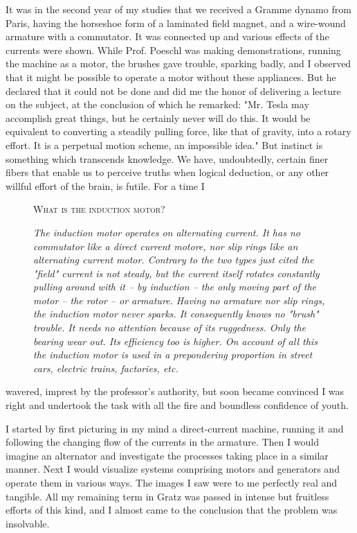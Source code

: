 \documentclass[a4paper,12pt,english,twoside,openright]{memoir}
\begin{document}
It was in the second year of my studies that we received a Gramme dynamo from Paris, having 
the horseshoe form of a laminated field magnet, and a wire-wound armature with a commutator.  
It was connected up and various effects of the currents were shown.  While Prof. Poeschl was 
making demonstrations, running the machine as a motor, the brushes gave trouble, sparking 
badly, and I observed that it might be possible to operate a motor without these appliances.  But 
he declared that it could not be done and did me the honor of delivering a lecture on the subject, 
at the conclusion of which he remarked: "Mr. Tesla may accomplish great things, but he certainly 
never will do this.  It would be equivalent to converting a steadily pulling force, like that of gravity, 
into a rotary effort.  It is a perpetual motion scheme, an impossible idea." But instinct 
is something which transcends knowledge. We have, undoubtedly, certain finer fibers that enable us to 
perceive truths when logical deduction, or any other willful effort of the brain, is futile.  For a time I 
\begin{figure}
	\begin{minipage}[t]{.63\textwidth}
		{\centering\textsc{What is the induction motor?}\par}
		\vspace{1em}
		\itshape
		The induction motor operates on alternating current. It has no commutator like a direct current motore, nor slip rings like an alternating current motor. Contrary to the two types just cited the "field" current is not steady, but the current itself rotates constantly pulling around with it -- by induction -- the only moving part of the motor -- the rotor -- or armature. Having no armature nor slip rings, the induction motor never sparks. It consequently knows no "brush" trouble. It needs no attention because of its ruggedness. Only the bearing wear out. Its efficiency too is higher. On account of all this the induction motor is used in a prepondering proportion in street cars, electric trains, factories, etc.
	\end{minipage}
	\vspace{1em}
\end{figure}
wavered, imprest by the professor's authority, but soon became convinced I was right and 
undertook the task with all the fire and boundless confidence of youth.  

I started by first picturing in my mind a direct-current machine, running it and following the 
changing flow of the currents in the armature.  Then I would imagine an alternator and investigate 
the processes taking place in a similar manner.  Next I would visualize systems comprising 
motors and generators and operate them in various ways.  The images I saw were to me 
perfectly real and tangible.  All my remaining term in Gratz was passed in intense but fruitless 
efforts of this kind, and I almost came to the conclusion that the problem was insolvable.  
\end{document}
